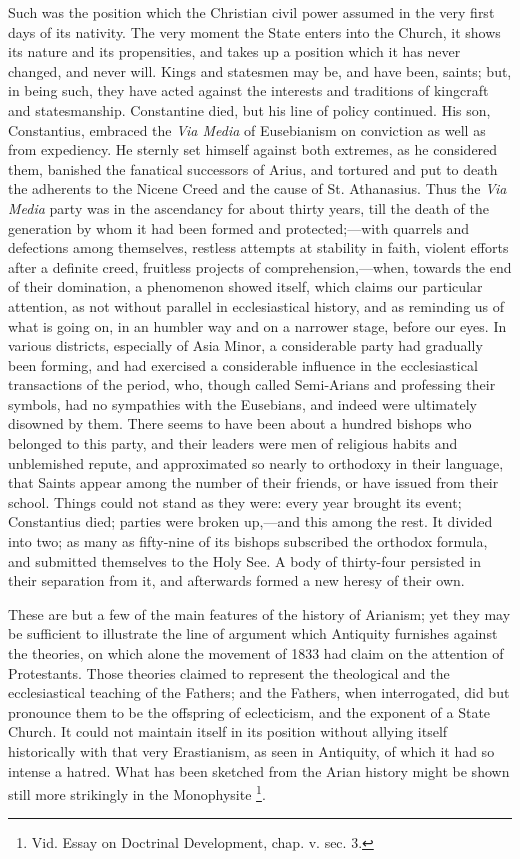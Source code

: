 Such was the position which the Christian civil power assumed in
the very first days of its nativity. The very moment the State enters
into the Church, it shows its nature and its propensities, and takes
up a position which it has never changed, and never will. Kings and
statesmen may be, and have been, saints; but, in being such, they have
acted against the interests and traditions of kingcraft and
statesmanship. Constantine died, but his line of policy continued. His
son, Constantius, embraced the \emph{Via Media} of Eusebianism on
conviction as well as from expediency. He sternly set himself against
both extremes, as he considered them, banished the fanatical
successors of Arius, and tortured and put to death the adherents to
the Nicene Creed and the cause of St. Athanasius. Thus the \emph{Via
Media} party was in the ascendancy for about thirty years, till the
death of the generation by whom it had been formed and protected;—with
quarrels and defections among themselves, restless attempts at
stability in faith, violent efforts after a definite creed, fruitless
projects of comprehension,—when, towards the end of their
domination, a phenomenon showed itself, which claims our particular
attention, as not without parallel in ecclesiastical history, and as
reminding us of what is going on, in an humbler way and on a narrower
stage, before our eyes. In various districts, especially of Asia
Minor, a considerable party had gradually been forming, and had
exercised a considerable influence in the ecclesiastical transactions
of the period, who, though called Semi-Arians and professing their
symbols, had no sympathies with the Eusebians, and indeed were
ultimately disowned by them. There seems to have been about a hundred
bishops who belonged to this party, and their leaders were men of
religious habits and unblemished repute, and approximated so nearly to
orthodoxy in their language, that Saints appear among the number of
their friends, or have issued from their school. Things could not
stand as they were: every year brought its event; Constantius died;
parties were broken up,—and this among the rest. It divided into
two; as many as fifty-nine of its bishops subscribed the orthodox
formula, and submitted themselves to the Holy See. A body of
thirty-four persisted in their separation from it, and afterwards
formed a new heresy of their own.

These are but a few of the main features of the history of Arianism;
yet they may be sufficient to illustrate the line of argument which
Antiquity furnishes against the theories, on which alone the movement
of 1833 had claim on the attention of Protestants. Those theories
claimed to represent the theological and the ecclesiastical teaching
of the Fathers; and the Fathers, when interrogated, did but pronounce
them to be the offspring of eclecticism, and the exponent of a State
Church. It could not maintain itself in its position without allying
itself historically with that very Erastianism, as seen in Antiquity,
of which it had so intense a hatred. What has been sketched from the
Arian history might be shown still more strikingly in the Monophysite
\footnote{Vid. Essay on Doctrinal Development, chap.
v. sec. 3.}.

